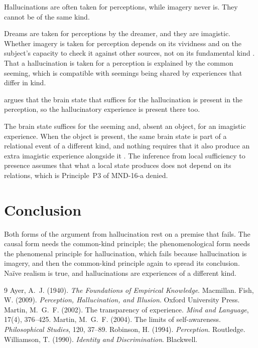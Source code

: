\documentclass{situationist-preprint}
\begin{document}
\begin{objection}
Hallucinations are often taken for perceptions, while imagery never is. They cannot be of the same kind.
\end{objection}

\begin{reply}
Dreams are taken for perceptions by the dreamer, and they are imagistic. Whether imagery is taken for perception depends on its vividness and on the subject's capacity to check it against other sources, not on its fundamental kind \citep{Fish2009}. That a hallucination is taken for a perception is explained by the common seeming, which is compatible with seemings being shared by experiences that differ in kind.
\end{reply}

\begin{objection}
\citet{Robinson1994} argues that the brain state that suffices for the hallucination is present in the perception, so the hallucinatory experience is present there too.
\end{objection}

\begin{reply}
The brain state suffices for the seeming and, absent an object, for an imagistic experience. When the object is present, the same brain state is part of a relational event of a different kind, and nothing requires that it also produce an extra imagistic experience alongside it \citep{Martin2004}. The inference from local sufficiency to presence assumes that what a local state produces does not depend on its relations, which is Principle~P3 of MND-16-a denied.
\end{reply}

\section{Conclusion}

Both forms of the argument from hallucination rest on a premise that fails. The causal form needs the common-kind principle; the phenomenological form needs the phenomenal principle for hallucination, which fails because hallucination is imagery, and then the common-kind principle again to spread its conclusion. Naïve realism is true, and hallucinations are experiences of a different kind.

\begin{thebibliography}{9}\small
{} Ayer, A.~J. (1940). \emph{The Foundations of Empirical Knowledge}. Macmillan.
 Fish, W. (2009). \emph{Perception, Hallucination, and Illusion}. Oxford University Press.
 Martin, M.~G.~F. (2002). The transparency of experience. \emph{Mind and Language}, 17(4), 376--425.
 Martin, M.~G.~F. (2004). The limits of self-awareness. \emph{Philosophical Studies}, 120, 37--89.
 Robinson, H. (1994). \emph{Perception}. Routledge.
 Williamson, T. (1990). \emph{Identity and Discrimination}. Blackwell.
\end{thebibliography}
\end{document}
